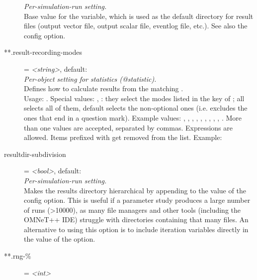 \begin{description}
    \textit{Per-simulation-run setting.}\\
    Base value for the 
    variable, which is used as the default directory for result files (output
    vector file, output scalar file, eventlog file, etc.). See also the
     config option.
\item[**.result-recording-modes] = \textit{<string>}, default: \\
    \textit{Per-object setting for statistics (@statistic).}\\
    Defines how to calculate results from the matching
    .\\
    Usage:
    .
    Special values: , : they select the modes listed in
    the  key of ; all selects all of
    them, default selects the non-optional ones (i.e. excludes the ones that
    end in a question mark). Example values: , ,
    , , , , , ,
    , . More than one values are accepted, separated
    by commas. Expressions are allowed. Items prefixed with
    \ttt{-{\allowbreak}} get removed from the list. Example:
\item[resultdir-subdivision] = \textit{<bool>}, default: \\
    \textit{Per-simulation-run setting.}\\
    Makes the results directory hierarchical by appending
     to the value of the
     config option. This is useful if a parameter
    study produces a large number of runs (>10000), as many file managers and
    other tools (including the OMNeT++ IDE) struggle with directories
    containing that many files. An alternative to using this option is to
    include iteration variables directly in the value of the
     option.
\item[**.rng-\%] = \textit{<int>}\\

\end{description}
